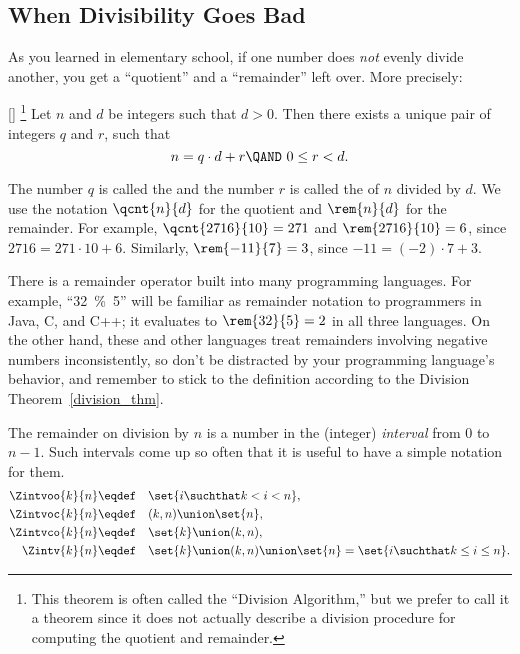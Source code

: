 \subsection{When Divisibility Goes Bad}

As you learned in elementary school, if one number does \emph{not}
evenly divide another, you get a ``quotient'' and a ``remainder'' left
over.  More precisely:
\begin{theorem}\label{division_thm}[]%
\footnote{This theorem is often called the ``Division Algorithm,'' but
  we prefer to call it a theorem since it does not actually describe
  a division procedure for computing the quotient and remainder.}  Let
$n$ and $d$ be integers such that $d > 0$.  Then there exists a unique
pair of integers $q$ and $r$, such that
\begin{equation}\label{nqdr}
n = q \cdot d + r \QAND\ 0 \leq r < d.
\end{equation}
\end{theorem}
The number $q$ is called the  and the number $r$ is
called the  of $n$ divided by $d$.  We use the
notation $\qcnt{n}{d}$ for the quotient and $\rem{n}{d}$ for the
remainder. For example, $\qcnt{2716}{10} = 271$ and $\rem{2716}{10} =
6$, since $2716 = 271 \cdot 10 + 6$.  Similarly, $\rem{-11}{7} = 3$,
since $-11 = (-2) \cdot 7 + 3$.

There is a remainder operator built into many programming languages.
For example, ``32~\%~5'' will be familiar as remainder notation to
programmers in Java, C, and C++; it evaluates to $\rem{32}{5} =2$ in
all three languages.  On the other hand, these and other languages treat
remainders involving negative numbers inconsistently, so don't be
distracted by your programming language's behavior, and remember to
stick to the definition according to the Division
Theorem~\ref{division_thm}.

The remainder on division by $n$ is a number in the (integer)
\emph{interval} from 0 to $n-1$.  Such intervals come up so often that
it is useful to have a simple notation for them.
\begin{align*}
\Zintvoo{k}{n} & \eqdef\quad \set{i \suchthat k < i < n},\\
\Zintvoc{k}{n} & \eqdef\quad (k,n) \union \set{n},\\ 
\Zintvco{k}{n} & \eqdef\quad \set{k} \union (k,n),\\
\Zintv{k}{n}   & \eqdef\quad \set{k} \union (k,n) \union \set{n} = \set{i \suchthat k \leq i \leq n}.
\end{align*}

